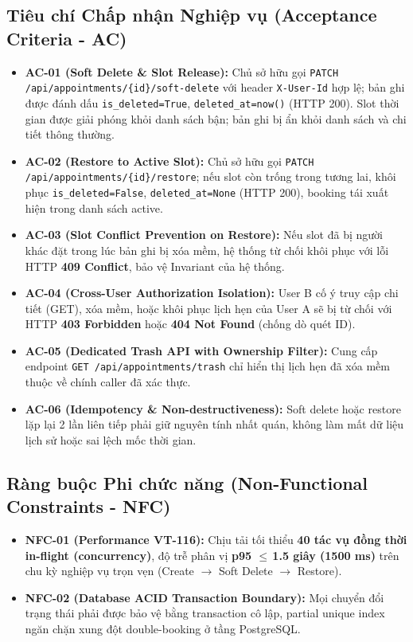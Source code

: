 \documentclass[10pt,a4paper]{article}
\newcommand{\LE}{\ensuremath{\leq}\,}
\begin{document}
\subsection{Tiêu chí Chấp nhận Nghiệp vụ (Acceptance Criteria - AC)}
\begin{itemize}[leftmargin=1.1em,itemsep=0.2pt]
  \item \textbf{AC-01 (Soft Delete \& Slot Release):} Chủ sở hữu gọi \texttt{PATCH /api/appointments/\{id\}/soft-delete} với header \texttt{X-User-Id} hợp lệ; bản ghi được đánh dấu \texttt{is\_deleted=True}, \texttt{deleted\_at=now()} (HTTP 200). Slot thời gian được giải phóng khỏi danh sách bận; bản ghi bị ẩn khỏi danh sách và chi tiết thông thường.
  \item \textbf{AC-02 (Restore to Active Slot):} Chủ sở hữu gọi \texttt{PATCH /api/appointments/\{id\}/restore}; nếu slot còn trống trong tương lai, khôi phục \texttt{is\_deleted=False}, \texttt{deleted\_at=None} (HTTP 200), booking tái xuất hiện trong danh sách active.
  \item \textbf{AC-03 (Slot Conflict Prevention on Restore):} Nếu slot đã bị người khác đặt trong lúc bản ghi bị xóa mềm, hệ thống từ chối khôi phục với lỗi HTTP \textbf{409 Conflict}, bảo vệ Invariant của hệ thống.
  \item \textbf{AC-04 (Cross-User Authorization Isolation):} User B cố ý truy cập chi tiết (GET), xóa mềm, hoặc khôi phục lịch hẹn của User A sẽ bị từ chối với HTTP \textbf{403 Forbidden} hoặc \textbf{404 Not Found} (chống dò quét ID).
  \item \textbf{AC-05 (Dedicated Trash API with Ownership Filter):} Cung cấp endpoint \texttt{GET /api/appointments/trash} chỉ hiển thị lịch hẹn đã xóa mềm thuộc về chính caller đã xác thực.
  \item \textbf{AC-06 (Idempotency \& Non-destructiveness):} Soft delete hoặc restore lặp lại 2 lần liên tiếp phải giữ nguyên tính nhất quán, không làm mất dữ liệu lịch sử hoặc sai lệch mốc thời gian.
\end{itemize}

\subsection{Ràng buộc Phi chức năng (Non-Functional Constraints - NFC)}
\begin{itemize}[leftmargin=1.1em,itemsep=0.2pt]
  \item \textbf{NFC-01 (Performance VT-116):} Chịu tải tối thiểu \textbf{40 tác vụ đồng thời in-flight (concurrency)}, độ trễ phân vị \textbf{p95 \LE 1.5 giây (1500 ms)} trên chu kỳ nghiệp vụ trọn vẹn (Create $\rightarrow$ Soft Delete $\rightarrow$ Restore).
  \item \textbf{NFC-02 (Database ACID Transaction Boundary):} Mọi chuyển đổi trạng thái phải được bảo vệ bằng transaction cô lập, partial unique index ngăn chặn xung đột double-booking ở tầng PostgreSQL.
\end{itemize}
\end{document}
